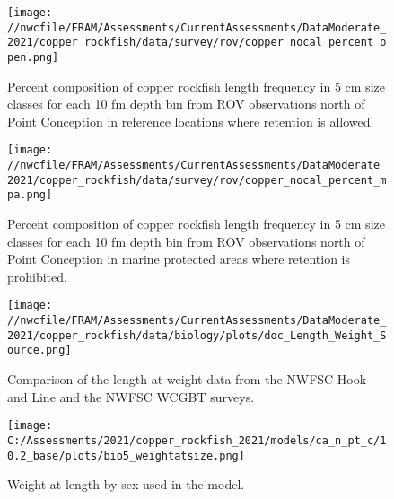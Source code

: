 \documentclass[11pt,
  english,
  a4paper,
]{article}
\begin{document}
\begin{figure}
\centering
\texttt{[image: //nwcfile/FRAM/Assessments/CurrentAssessments/DataModerate\_2021/copper\_rockfish/data/survey/rov/copper\_nocal\_percent\_open.png]}
\caption{Percent composition of copper rockfish length frequency in 5 cm size classes for each 10 fm depth bin from ROV observations north of Point Conception in reference locations where retention is allowed.\label{fig:rov-percent-open}}
\end{figure}

\tagmcend\tagstructend

\clearpage


\begin{figure}
\centering
\texttt{[image: //nwcfile/FRAM/Assessments/CurrentAssessments/DataModerate\_2021/copper\_rockfish/data/survey/rov/copper\_nocal\_percent\_mpa.png]}
\caption{Percent composition of copper rockfish length frequency in 5 cm size classes for each 10 fm depth bin from ROV observations north of Point Conception in marine protected areas where retention is prohibited.\label{fig:rov-percent-mpa}}
\end{figure}

\tagmcend\tagstructend


\begin{figure}
\centering
\texttt{[image: //nwcfile/FRAM/Assessments/CurrentAssessments/DataModerate\_2021/copper\_rockfish/data/biology/plots/doc\_Length\_Weight\_Source.png]}
\caption{Comparison of the length-at-weight data from the NWFSC Hook and Line and the NWFSC WCGBT surveys.\label{fig:len-weight-survey}}
\end{figure}

\tagmcend\tagstructend


\begin{figure}
\centering
\texttt{[image: C:/Assessments/2021/copper\_rockfish\_2021/models/ca\_n\_pt\_c/10.2\_base/plots/bio5\_weightatsize.png]}
\caption{Weight-at-length by sex used in the model.\label{fig:len-weight}}
\end{figure}
\end{document}
